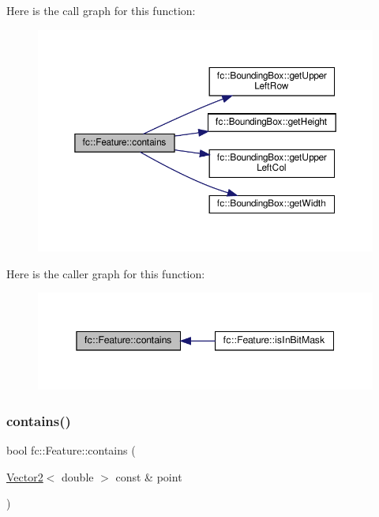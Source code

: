 Here is the call graph for this function\+:
\nopagebreak
\begin{figure}[H]
\begin{center}
\leavevmode
\includegraphics[width=350pt]{d7/d71/classfc_1_1Feature_ae1c529caa66d56edfb361431a832f806_cgraph}
\end{center}
\end{figure}
Here is the caller graph for this function\+:
\nopagebreak
\begin{figure}[H]
\begin{center}
\leavevmode
\includegraphics[width=345pt]{d7/d71/classfc_1_1Feature_ae1c529caa66d56edfb361431a832f806_icgraph}
\end{center}
\end{figure}
\mbox{\label{classfc_1_1Feature_a0f716104b68b033b427c60c1f2672a76}} 
\subsubsection{\texorpdfstring{contains()}{contains()}\hspace{0.1cm}{\footnotesize\ttfamily [2/2]}}
{\footnotesize\ttfamily bool fc\+::\+Feature\+::contains (\begin{DoxyParamCaption}\item[{\hyperlink{classfc_1_1Vector2}{Vector2}$<$ double $>$ const \&}]{point }\end{DoxyParamCaption})\hspace{0.3cm}{\ttfamily [inline]}}




